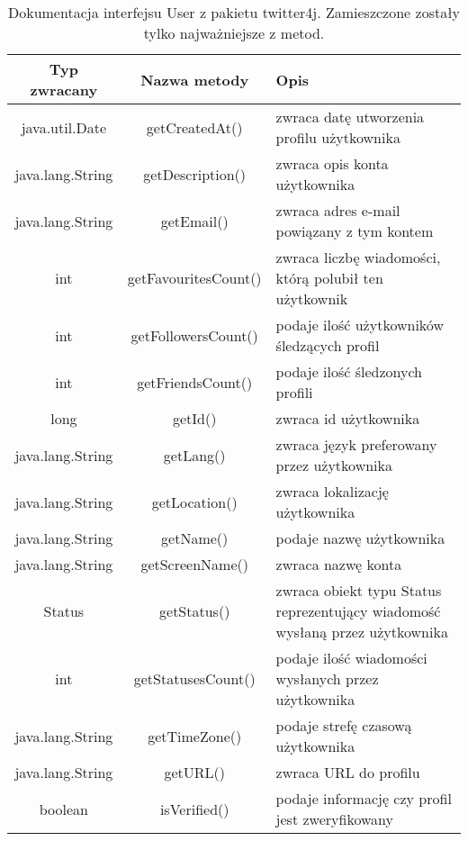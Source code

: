 \begin{table}
\centering
\caption{Dokumentacja interfejsu User z pakietu twitter4j. Zamieszczone zostały tylko najważniejsze z metod.}
\label{tab:table1}
\begin{tabularx}{\linewidth}{|c|c|X|}\toprule
    Typ zwracany & Nazwa metody & Opis \\ \midrule
    java.util.Date & getCreatedAt() & zwraca datę utworzenia profilu użytkownika \\ \midrule
    java.lang.String & getDescription() & zwraca opis konta użytkownika \\ \midrule
    java.lang.String & getEmail() & zwraca adres e-mail powiązany z tym kontem \\ \midrule
    int & getFavouritesCount() & zwraca liczbę wiadomości, którą polubił ten użytkownik \\ \midrule
    int & getFollowersCount() & podaje ilość użytkowników śledzących profil \\ \midrule
    int & getFriendsCount() & podaje ilość śledzonych profili \\ \midrule
    long & getId() & zwraca id użytkownika \\ \midrule
    java.lang.String & getLang() & zwraca język preferowany przez użytkownika \\ \midrule
    java.lang.String & getLocation() & zwraca lokalizację użytkownika \\ \midrule
    java.lang.String & getName() & podaje nazwę użytkownika \\ \midrule
    java.lang.String & getScreenName() & zwraca nazwę konta \\ \midrule
    Status & getStatus() & zwraca obiekt typu Status reprezentujący wiadomość wysłaną przez użytkownika \\ \midrule
    int & getStatusesCount() & podaje ilość wiadomości wysłanych przez użytkownika \\ \midrule
    java.lang.String & getTimeZone() & podaje strefę czasową użytkownika \\ \midrule
    java.lang.String & getURL() & zwraca URL do profilu \\ \midrule
    boolean & isVerified() & podaje informację czy profil jest zweryfikowany \\ \bottomrule 
\end{tabularx}
\end{table}
